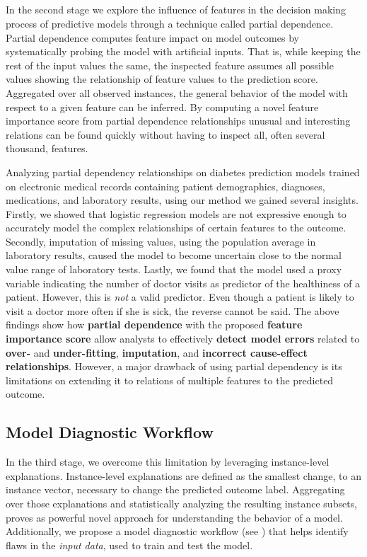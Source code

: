 \subsection{\prospector}
In the second stage we explore the influence of features in the decision making process of predictive models through a technique called partial dependence. Partial dependence computes feature impact on model outcomes by systematically probing the model with artificial inputs. That is, while keeping the rest of the input values the same, the inspected feature assumes all possible values showing the relationship of feature values to the prediction score. Aggregated over all observed instances, the general behavior of the model with respect to a given feature can be inferred. By computing a novel feature importance score from partial dependence relationships unusual and interesting relations can be found quickly without having to inspect all, often several thousand, features.

Analyzing partial dependency relationships on diabetes prediction models trained on electronic medical records containing patient demographics, diagnoses, medications, and laboratory results, using our method we gained several insights. Firstly, we showed that logistic regression models are not expressive enough to accurately model the complex relationships of certain features to the outcome. Secondly, imputation of missing values, using the population average in laboratory results, caused the model to become uncertain close to the normal value range of laboratory tests. Lastly, we found that the model used a proxy variable indicating the number of doctor visits as predictor of the healthiness of a patient. However, this is \emph{not} a valid predictor. Even though a patient is likely to visit a doctor more often if she is sick, the reverse cannot be said. The above findings show how \textbf{partial dependence} with the proposed \textbf{feature importance score} allow analysts to effectively \textbf{detect model errors} related to \textbf{over-} and \textbf{under-fitting}, \textbf{imputation}, and \textbf{incorrect cause-effect relationships}.
However, a major drawback of using partial dependency is its limitations on extending it to relations of multiple features to the predicted outcome.



\subsection{Model Diagnostic Workflow}
In the third stage, we overcome this limitation by leveraging instance-level explanations. Instance-level explanations are defined as the smallest change, to an instance vector, necessary to change the predicted outcome label. Aggregating over those explanations and statistically analyzing the resulting instance subsets, proves as powerful novel approach for understanding the behavior of a model. Additionally, we propose a model diagnostic workflow (see ) that helps identify flaws in the \emph{input data}, used to train and test the model.

